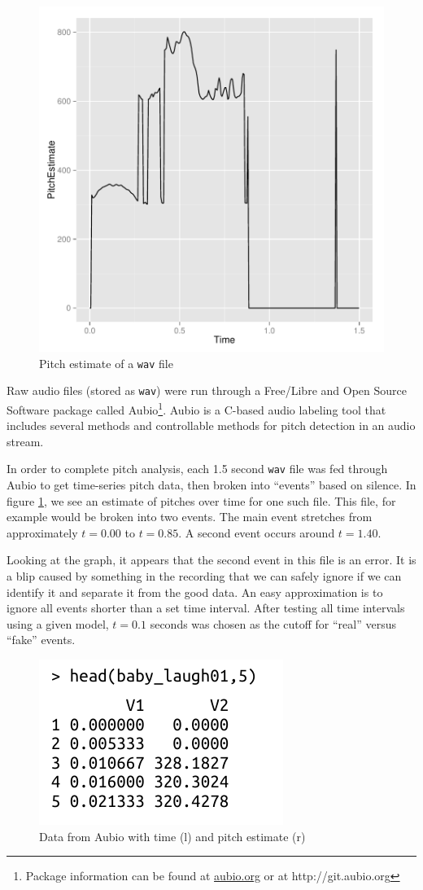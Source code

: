 \documentclass[paper=a4, fontsize=11pt]{scrartcl}
\numberwithin{equation}{section}
\numberwithin{figure}{section}
\numberwithin{table}{section}
\begin{document}
\begin{figure}
\begin{center}
\vspace{-20pt}
\includegraphics[width=.38\textwidth]{pitch_time.pdf}
\caption{Pitch estimate of a \texttt{wav} file}\label{fig:aubiograph}
\vspace{-20pt}
\end{center}
\end{figure}

\noindent Raw audio files (stored as \texttt{wav}) were run through a Free/Libre and Open Source Software package called Aubio\footnote{Package information can be found at \url{aubio.org} or at http://git.aubio.org}. Aubio is a C-based audio labeling tool that includes several methods and controllable methods for pitch detection in an audio stream.

\noindent In order to complete pitch analysis, each 1.5 second \texttt{wav} file was fed through Aubio to get time-series pitch data, then broken into ``events'' based on silence. In figure \ref{fig:aubiograph}, we see an estimate of pitches over time for one such file. This file, for example would be broken into two events. The main event stretches from approximately $t=0.00$ to $t=0.85$. A second event occurs around $t=1.40$.

\noindent Looking at the graph, it appears that the second event in this file is an error. It is a blip caused by something in the recording that we can safely ignore if we can identify it and separate it from the good data. An easy approximation is to ignore all events shorter than a set time interval. After testing all time intervals using a given model, $t=0.1$ seconds was chosen as the cutoff for ``real'' versus ``fake'' events.

\begin{figure}
\begin{center}
\vspace{-15pt}
\includegraphics[width=.28\textwidth]{aubio_out.pdf}
\caption{Data from Aubio with time (l) and pitch estimate (r)}\label{fig:headaubio}
\end{center}
\vspace{-20pt}
\end{figure}
\end{document}
